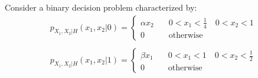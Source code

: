 \begin{solution}
\end{solution}

\else

\question Consider a binary decision problem characterized by:
  $$ \begin{array}{l} 
					   p_{X_1,X_2|H}(x_1,x_2 | 0) = \left\lbrace   \begin{array}{ll} \alpha x_2 & \quad 0<x_1< \displaystyle \frac{1}{4} \quad 0<x_2<1 \\
					   0 &  \quad  \mbox{otherwise}\end{array} \right.	   \\ \\
					  p_{X_1,X_2|H}(x_1,x_2 | 1) = \left\lbrace   \begin{array}{ll} \beta x_1 & \quad 0<x_1<1 \quad 0<x_2<  \displaystyle \frac{1}{2} \\
					   0 &  \quad  \mbox{otherwise}\end{array} \right.	
  \end{array}$$ 
